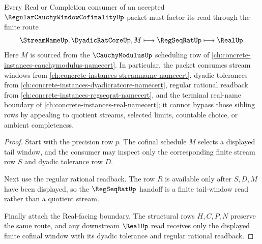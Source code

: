 \begin{theorem}
\label{thm:regular-cauchy-window-cofinality-sibling-route}
Every Real or Completion consumer of an accepted $\RegularCauchyWindowCofinalityUp$ packet must factor its read through the finite route
$$
\StreamNameUp,\DyadicRatCoreUp,M \longmapsto \RegSeqRatUp \longmapsto \RealUp .
$$
Here $M$ is sourced from the $\CauchyModulusUp$ scheduling row of \autoref{ch:concrete-instances-cauchymodulus-namecert}. In particular, the packet consumes stream windows from \autoref{ch:concrete-instances-streamname-namecert}, dyadic tolerances from \autoref{ch:concrete-instances-dyadicratcore-namecert}, regular rational readback from \autoref{ch:concrete-instances-regseqrat-namecert}, and the terminal real-name boundary of \autoref{ch:concrete-instances-real-namecert}; it cannot bypass those sibling rows by appealing to quotient streams, selected limits, countable choice, or ambient completeness.
\end{theorem}
\begin{proof}
Start with the precision row $p$. The cofinal schedule $M$ selects a displayed tail window, and the consumer may inspect only the corresponding finite stream row $S$ and dyadic tolerance row $D$.

Next use the regular rational readback. The row $R$ is available only after $S,D,M$ have been displayed, so the $\RegSeqRatUp$ handoff is a finite tail-window read rather than a quotient stream.

Finally attach the Real-facing boundary. The structural rows $H,C,P,N$ preserve the same route, and any downstream $\RealUp$ read receives only the displayed finite cofinal window with its dyadic tolerance and regular rational readback.
\end{proof}

